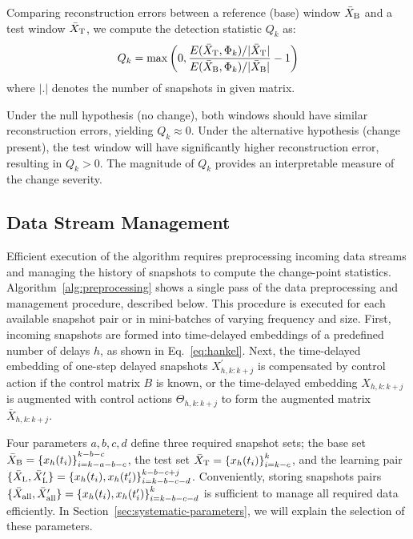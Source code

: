 Comparing reconstruction errors between a reference (base) window \(\bar{X} _{\text{B}}\) and a test window \(\bar{X} _{\text{T}}\), we compute the detection statistic \(Q_k\) as:
\begin{equation}
\label{eq:cpd-statistic}
Q_k = \max\left(0, \frac{E(\ui{\bar{X}}{T}, \Phi_k)/|\ui{\bar{X}}{T}|}{E(\ui{\bar{X}}{B}, \Phi_k)/|\ui{\bar{X}}{B}|} - 1\right)
\end{equation}
where \(|.|\) denotes the number of snapshots in given matrix.

Under the null hypothesis (no change), both windows should have similar reconstruction errors, yielding \(Q_k \approx 0\). Under the alternative hypothesis (change present), the test window will have significantly higher reconstruction error, resulting in \(Q_k > 0\). The magnitude of \(Q_k\) provides an interpretable measure of the change severity.

\subsection{Data Stream Management}
Efficient execution of the algorithm requires preprocessing incoming data streams and managing the history of snapshots to compute the change-point statistics. Algorithm~\ref{alg:preprocessing} shows a single pass of the data preprocessing and management procedure, described below. This procedure is executed for each available snapshot pair or in mini-batches of varying frequency and size. First, incoming snapshots are formed into time-delayed embeddings of a predefined number of delays \( h \), as shown in Eq.~\eqref{eq:hankel}. Next, the time-delayed embedding of one-step delayed snapshots \( X^\prime_{h, k: k + j} \) is compensated by control action if the control matrix \( B \) is known, or the time-delayed embedding \( X_{h, k: k + j} \) is augmented with control actions \( \Theta_{h, k: k + j} \) to form the augmented matrix \( \bar{X}_{h, k: k + j} \).

Four parameters \(a, b, c, d\) define three required snapshot sets; the base set \({\bar{X} _{\text{B}} = \{x_h(t_i)\}}^{k - b - c}_{i=k - a - b - c}\), the test set \(\bar{X} _{\text{T}} = {\{x_h(t_i)\}}^{k}_{i=k - c}\), and the learning pair \( \{\bar{X} _{\text{L}}, \bar{X}^\prime _{\text{L}}\} = {\{x_h(t_i), x_h(t_i^\prime )\}}^{k - b - c + j}_{i=k - b - c - d}\). Conveniently, storing snapshots pairs \( \{\bar{X} _{\text{all}}, \bar{X}^\prime _{\text{all}}\} = {\{x_h(t_i), x_h(t_i^\prime )\}}^{k}_{i=k - b - c - d}\) is sufficient to manage all required data efficiently. In Section~\ref{sec:systematic-parameters}, we will explain the selection of these parameters.

